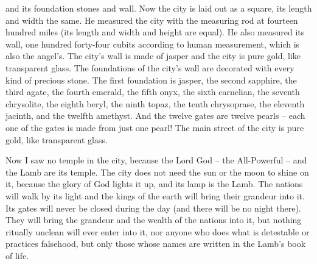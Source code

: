 {and
its
foundation
stones and
wall.
Now
the city
is laid out
as a square,
its
length
and width
the same. He
measured
the city
with the measuring rod
at
fourteen hundred miles
(its
length
and
width
and
height
are
equal).
He
also
measured
its
wall,
one hundred
forty-four
cubits
according to human
measurement,
which
is
also the angel’s.
The city’s wall
is made
of jasper
and
the city
is pure
gold,
like
transparent
glass.
The foundations
of the city’s
wall
are decorated
with every kind
of precious
stone.
The first
foundation
is jasper,
the second
sapphire,
the third
agate,
the fourth
emerald,
the fifth
onyx,
the sixth
carnelian,
the seventh
chrysolite,
the eighth
beryl,
the ninth
topaz,
the tenth
chrysoprase,
the eleventh
jacinth,
and the twelfth
amethyst.
And
the twelve
gates
are twelve
pearls
– each
one
of the gates
is
made from
just one
pearl! The main street
of the city
is pure
gold,
like
transparent
glass.
\par }{\PP {}Now
I saw
no
temple
in
the city,
because
the Lord
God
– the All-Powerful –
and
the Lamb
are
its
temple.
The city
does
not
need
the sun
or
the moon
to
shine
on it,
because
the glory
of God
lights
it
up,
and
its
lamp
is the Lamb.
The nations
will walk
by
its
light
and
the kings
of the earth
will bring
their
grandeur
into
it.
Its
gates
will
never
be closed
during the day
(and there will be
no
night
there).
They will bring
the grandeur
and
the wealth
of the nations
into
it,
but
nothing
ritually unclean
will ever enter
into
it,
nor
anyone
who does
what is detestable
or
practices falsehood,
but
only those whose names are written
in
the Lamb’s
book
of life.

}
